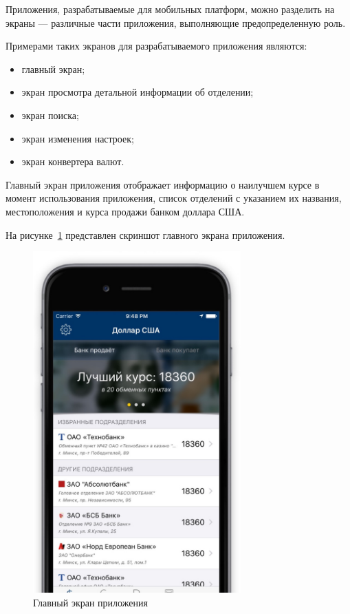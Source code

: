 Приложения, разрабатываемые для мобильных платформ, можно разделить
на экраны --- различные части приложения, выполняющие предопределенную роль.

Примерами таких экранов для разрабатываемого приложения являются:
\begin{itemize}
  \item главный экран;
  \item экран просмотра детальной информации об отделении;
  \item экран поиска;
  \item экран изменения настроек;
  \item экран конвертера валют.
\end{itemize}

Главный экран приложения отображает информацию о наилучшем курсе в момент
использования приложения, список отделений с указанием их названия,
местоположения и курса продажи банком доллара США.

\pagebreak


На рисунке~\ref{fig:screen_main} представлен скриншот главного экрана приложения.

\begin{figure}[h!]
  \centering
  \includegraphics[width=80mm]{pic/screen_main}
  \caption{Главный экран приложения}
  \label{fig:screen_main}
\end{figure}

